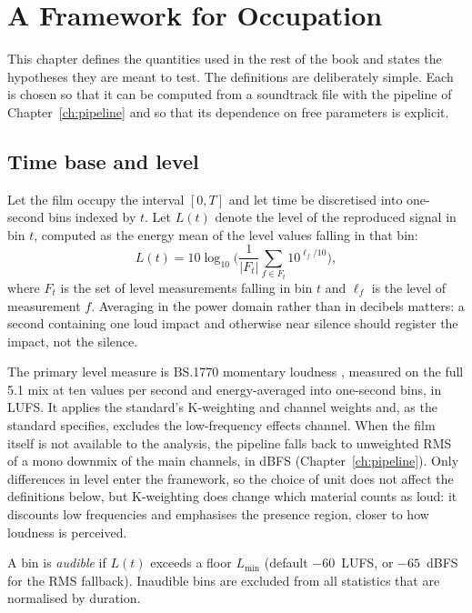 \chapter{A Framework for Occupation}
\label{ch:framework}

This chapter defines the quantities used in the rest of the book and states the hypotheses they are meant to test. The definitions are deliberately simple. Each is chosen so that it can be computed from a soundtrack file with the pipeline of Chapter~\ref{ch:pipeline} and so that its dependence on free parameters is explicit.

\section{Time base and level}

Let the film occupy the interval $[0, T]$ and let time be discretised into one-second bins indexed by $t$. Let $L(t)$ denote the level of the reproduced signal in bin $t$, computed as the energy mean of the level values falling in that bin:
\begin{equation}
L(t) = 10\log_{10}\Big(\frac{1}{|F_t|}\sum_{f\in F_t} 10^{\ell_f/10}\Big),
\end{equation}
where $F_t$ is the set of level measurements falling in bin $t$ and $\ell_f$ is the level of measurement $f$. Averaging in the power domain rather than in decibels matters: a second containing one loud impact and otherwise near silence should register the impact, not the silence.

The primary level measure is BS.1770 momentary loudness \citep{itu1770}, measured on the full 5.1 mix at ten values per second and energy-averaged into one-second bins, in LUFS. It applies the standard's K-weighting and channel weights and, as the standard specifies, excludes the low-frequency effects channel. When the film itself is not available to the analysis, the pipeline falls back to unweighted RMS of a mono downmix of the main channels, in dBFS (Chapter~\ref{ch:pipeline}). Only differences in level enter the framework, so the choice of unit does not affect the definitions below, but K-weighting does change which material counts as loud: it discounts low frequencies and emphasises the presence region, closer to how loudness is perceived.

A bin is \emph{audible} if $L(t)$ exceeds a floor $L_{\min}$ (default $-60$~LUFS, or $-65$~dBFS for the RMS fallback). Inaudible bins are excluded from all statistics that are normalised by duration.

